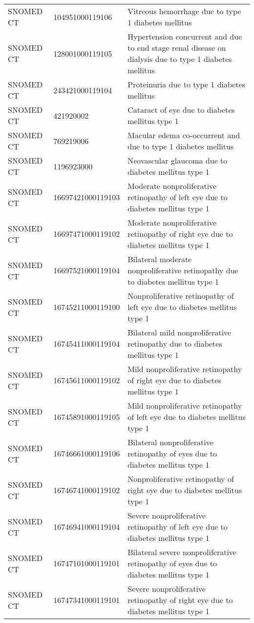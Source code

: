 \begin{longtable}{p{}p{}p{}}
  SNOMED CT & 104951000119106 & Vitreous hemorrhage due to type 1 diabetes mellitus \\ 
  SNOMED CT & 128001000119105 & Hypertension concurrent and due to end stage renal disease on dialysis due to type 1 diabetes mellitus \\ 
  SNOMED CT & 243421000119104 & Proteinuria due to type 1 diabetes mellitus \\ 
  SNOMED CT & 421920002 & Cataract of eye due to diabetes mellitus type 1 \\ 
  SNOMED CT & 769219006 & Macular edema co-occurrent and due to type 1 diabetes mellitus \\ 
  SNOMED CT & 1196923000 & Neovascular glaucoma due to diabetes mellitus type 1 \\ 
  SNOMED CT & 16697421000119103 & Moderate nonproliferative retinopathy of left eye due to diabetes mellitus type 1 \\ 
  SNOMED CT & 16697471000119102 & Moderate nonproliferative retinopathy of right eye due to diabetes mellitus type 1 \\ 
  SNOMED CT & 16697521000119104 & Bilateral moderate nonproliferative retinopathy due to diabetes mellitus type 1 \\ 
  SNOMED CT & 16745211000119100 & Nonproliferative retinopathy of left eye due to diabetes mellitus type 1 \\ 
  SNOMED CT & 16745411000119104 & Bilateral mild nonproliferative retinopathy due to diabetes mellitus type 1 \\ 
  SNOMED CT & 16745611000119102 & Mild nonproliferative retinopathy of right eye due to diabetes mellitus type 1 \\ 
  SNOMED CT & 16745891000119105 & Mild nonproliferative retinopathy of left eye due to diabetes mellitus type 1 \\ 
  SNOMED CT & 16746661000119106 & Bilateral nonproliferative retinopathy of eyes due to diabetes mellitus type 1 \\ 
  SNOMED CT & 16746741000119102 & Nonproliferative retinopathy of right eye due to diabetes mellitus type 1 \\ 
  SNOMED CT & 16746941000119104 & Severe nonproliferative retinopathy of left eye due to diabetes mellitus type 1 \\ 
  SNOMED CT & 16747101000119101 & Bilateral severe nonproliferative retinopathy of eyes due to diabetes mellitus type 1 \\ 
  SNOMED CT & 16747341000119101 & Severe nonproliferative retinopathy of right eye due to diabetes mellitus type 1 \\ 

\end{longtable}
